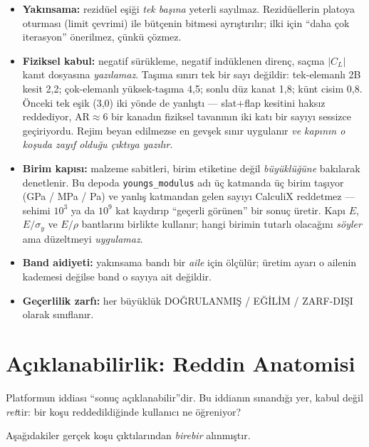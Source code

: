 \documentclass[11pt,a4paper]{article}
\begin{document}
\begin{itemize}\setlength\itemsep{1pt}
  \item \textbf{Yakınsama:} rezidüel eşiği \emph{tek başına} yeterli sayılmaz.
        Rezidüellerin platoya oturması (limit çevrimi) ile bütçenin bitmesi
        ayrıştırılır; ilki için ``daha çok iterasyon'' önerilmez, çünkü çözmez.
  \item \textbf{Fiziksel kabul:} negatif sürükleme, negatif indüklenen direnç,
        saçma $|C_L|$ kanıt dosyasına \emph{yazılamaz}. Taşıma sınırı tek bir
        sayı değildir: tek-elemanlı 2B kesit 2{,}2; çok-elemanlı yüksek-taşıma
        4{,}5; sonlu düz kanat 1{,}8; künt cisim 0{,}8. Önceki tek eşik (3{,}0)
        iki yönde de yanlıştı --- slat+flap kesitini haksız reddediyor,
        AR$\approx$6 bir kanadın fiziksel tavanının iki katı bir sayıyı sessizce
        geçiriyordu. Rejim beyan edilmezse en gevşek sınır uygulanır \emph{ve
        kapının o koşuda zayıf olduğu çıktıya yazılır}.
  \item \textbf{Birim kapısı:} malzeme sabitleri, birim etiketine değil
        \emph{büyüklüğüne} bakılarak denetlenir. Bu depoda \texttt{youngs\_modulus}
        adı üç katmanda üç birim taşıyor (GPa / MPa / Pa) ve yanlış katmandan
        gelen sayıyı CalculiX reddetmez --- sehimi $10^3$ ya da $10^9$ kat
        kaydırıp ``geçerli görünen'' bir sonuç üretir. Kapı $E$, $E/\sigma_y$ ve
        $E/\rho$ bantlarını birlikte kullanır; hangi birimin tutarlı olacağını
        \emph{söyler} ama düzeltmeyi \emph{uygulamaz}.
  \item \textbf{Band aidiyeti:} yakınsama bandı bir \emph{aile} için ölçülür;
        üretim ayarı o ailenin kademesi değilse band o sayıya ait değildir.
  \item \textbf{Geçerlilik zarfı:} her büyüklük DOĞRULANMIŞ / EĞİLİM /
        ZARF-DIŞI olarak sınıflanır.
\end{itemize}

\section{Açıklanabilirlik: Reddin Anatomisi}

Platformun iddiası ``sonuç açıklanabilir''dir. Bu iddianın sınandığı yer, kabul
değil \emph{ret}tir: bir koşu reddedildiğinde kullanıcı ne öğreniyor?

Aşağıdakiler gerçek koşu çıktılarından \emph{birebir} alınmıştır.
\end{document}
